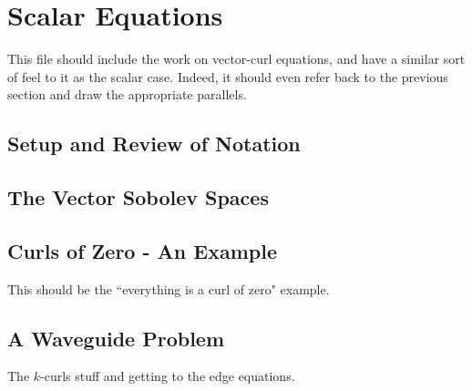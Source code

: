 \chapter{Scalar Equations}
This file should include the work on vector-curl equations, and have a similar sort of feel to it as the scalar case. Indeed, it should even refer back to the previous section and draw the appropriate parallels.

\section{Setup and Review of Notation}

\section{The Vector Sobolev Spaces}

\section{Curls of Zero - An Example}
This should be the ``everything is a curl of zero" example.

\section{A Waveguide Problem}
The $k$-curls stuff and getting to the edge equations.